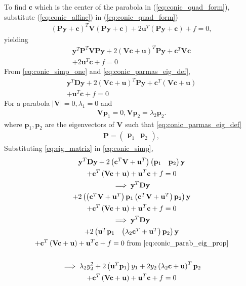 \documentclass[journal,10pt,twocolumn]{article}
\providecommand{\abs}[1]{\left\vert#1\right\vert}
\let\vec\mathbf
\newcommand{\myvec}[1]{\ensuremath{\begin{pmatrix}#1\end{pmatrix}}}
\providecommand{\brak}[1]{\ensuremath{\left(#1\right)}}
\begin{document}
To find $\vec{c}$ which is the center of the parabola in (\ref{eq:conic_quad_form}), substitute (\ref{eq:conic_affine}) in (\ref{eq:conic_quad_form})
\begin{multline}
\brak{\vec{P}\vec{y}+\vec{c}}^T\vec{V}\brak{\vec{P}\vec{y}+\vec{c}}+2\vec{u}^T\brak{\vec{P}\vec{y}+\vec{c}} + f = 0, 
\end{multline}
yielding 
\begin{multline}
\vec{y}^T\vec{P}^T\vec{V}\vec{P}\vec{y}+2\brak{\vec{V}\vec{c}+\vec{u}}^T\vec{P}\vec{y} +  \vec{c}^T\vec{V}\vec{c} 
\\
+2\vec{u}^T\vec{c} + f= 0
\label{eq:conic_simp_one}
\end{multline}
%
From \eqref{eq:conic_simp_one} and \eqref{eq:conic_parmas_eig_def},
\begin{multline}
\vec{y}^T\vec{D}\vec{y}+2\brak{\vec{V}\vec{c}+\vec{u}}^T\vec{P}\vec{y} +  \vec{c}^T\brak{\vec{V}\vec{c} + \vec{u}}
\\
+ \vec{u}^T\vec{c} + f= 0
\label{eq:conic_simp}
\end{multline}
For a parabola $\abs{\vec{V}} = 0, \lambda_1 = 0$ and
\begin{align}
\vec{V}\vec{p}_1 = 0, 
\vec{V}\vec{p}_2 = \lambda_2\vec{p}_2.
\label{eq:conic_parab_eig_prop} 
\end{align}
where $\vec{p}_1,\vec{p}_2$ are the eigenvectors of $\vec{V}$ such that  \eqref{eq:conic_parmas_eig_def}
%
\begin{align}
\vec{P} = \myvec{\vec{p}_1 & \vec{p}_2},
\label{eq:eig_matrix}
\end{align}
Substituting \eqref{eq:eig_matrix}
in \eqref{eq:conic_simp},
\begin{multline}
	\vec{y}^T\vec{D}\vec{y}+2\brak{\vec{c}^T\vec{V}+\vec{u}^T}\myvec{\vec{p}_1 & \vec{p}_2}\vec{y}
\\
+  \vec{c}^T\brak{\vec{V}\vec{c} + \vec{u}}+ \vec{u}^T\vec{c} + f= 0
\\
\implies \vec{y}^T\vec{D}\vec{y}
\\
+2\myvec{\brak{\vec{c}^T\vec{V}+\vec{u}^T}\vec{p}_1  \brak{\vec{c}^T\vec{V}+\vec{u}^T}\vec{p}_2}\vec{y}
\\
+  \vec{c}^T\brak{\vec{V}\vec{c} + \vec{u}}+ \vec{u}^T\vec{c} + f= 0
\\
\implies \vec{y}^T\vec{D}\vec{y}
\\
+2\myvec{\vec{u}^T\vec{p}_1 & \brak{\lambda_2\vec{c}^T+\vec{u}^T}\vec{p}_2}\vec{y}
\\
+  \vec{c}^T\brak{\vec{V}\vec{c} + \vec{u}}+ \vec{u}^T\vec{c} + f= 0
\text{ from } \eqref{eq:conic_parab_eig_prop}     \nonumber \\
\\
\implies \lambda_2y_2^2+2\brak{\vec{u}^T\vec{p}_1}y_1+  2y_2\brak{\lambda_2\vec{c}+\vec{u}}^T\vec{p}_2
\\
+  \vec{c}^T\brak{\vec{V}\vec{c} + \vec{u}}+ \vec{u}^T\vec{c} + f= 0
\label{eq:conic_parab_foc_len_temp} 
\end{multline}
\end{document}
